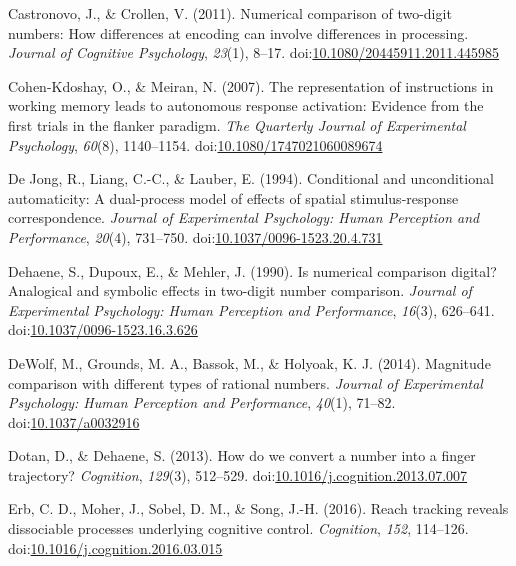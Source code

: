 \documentclass[english,man]{apa6}
\theoremstyle{definition}
\theoremstyle{definition}
\theoremstyle{definition}
\theoremstyle{remark}
\begin{document}
\hypertarget{refs}{}
\hypertarget{ref-castronovo2011}{}
Castronovo, J., \& Crollen, V. (2011). Numerical comparison of two-digit
numbers: How differences at encoding can involve differences in
processing. \emph{Journal of Cognitive Psychology}, \emph{23}(1), 8--17.
doi:\href{https://doi.org/10.1080/20445911.2011.445985}{10.1080/20445911.2011.445985}

\hypertarget{ref-cohenKdoshay2007}{}
Cohen-Kdoshay, O., \& Meiran, N. (2007). The representation of
instructions in working memory leads to autonomous response activation:
Evidence from the first trials in the flanker paradigm. \emph{The
Quarterly Journal of Experimental Psychology}, \emph{60}(8), 1140--1154.
doi:\href{https://doi.org/10.1080/1747021060089674}{10.1080/1747021060089674}

\hypertarget{ref-deJong1994}{}
De Jong, R., Liang, C.-C., \& Lauber, E. (1994). Conditional and
unconditional automaticity: A dual-process model of effects of spatial
stimulus-response correspondence. \emph{Journal of Experimental
Psychology: Human Perception and Performance}, \emph{20}(4), 731--750.
doi:\href{https://doi.org/10.1037/0096-1523.20.4.731}{10.1037/0096-1523.20.4.731}

\hypertarget{ref-dehaene1990}{}
Dehaene, S., Dupoux, E., \& Mehler, J. (1990). Is numerical comparison
digital? Analogical and symbolic effects in two-digit number comparison.
\emph{Journal of Experimental Psychology: Human Perception and
Performance}, \emph{16}(3), 626--641.
doi:\href{https://doi.org/10.1037/0096-1523.16.3.626}{10.1037/0096-1523.16.3.626}

\hypertarget{ref-dewolf2014}{}
DeWolf, M., Grounds, M. A., Bassok, M., \& Holyoak, K. J. (2014).
Magnitude comparison with different types of rational numbers.
\emph{Journal of Experimental Psychology: Human Perception and
Performance}, \emph{40}(1), 71--82.
doi:\href{https://doi.org/10.1037/a0032916}{10.1037/a0032916}

\hypertarget{ref-dotan2013}{}
Dotan, D., \& Dehaene, S. (2013). How do we convert a number into a
finger trajectory? \emph{Cognition}, \emph{129}(3), 512--529.
doi:\href{https://doi.org/10.1016/j.cognition.2013.07.007}{10.1016/j.cognition.2013.07.007}

\hypertarget{ref-erb2016}{}
Erb, C. D., Moher, J., Sobel, D. M., \& Song, J.-H. (2016). Reach
tracking reveals dissociable processes underlying cognitive control.
\emph{Cognition}, \emph{152}, 114--126.
doi:\href{https://doi.org/10.1016/j.cognition.2016.03.015}{10.1016/j.cognition.2016.03.015}
\end{document}
